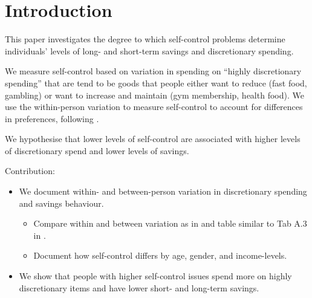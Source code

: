 
\section{Introduction}%
\label{sec:introduction}

This paper investigates the degree to which self-control problems determine
individuals' levels of long- and short-term savings and discretionary
spending.

We measure self-control based on variation in spending on ``highly
discretionary spending'' that are tend to be goods that people either want to
reduce (fast food, gambling) or want to increase and maintain (gym membership,
health food). We use the within-person variation to measure self-control to
account for differences in preferences, following \citet{cherchye2017new}.

We hypothesise that lower levels of self-control are associated with higher
levels of discretionary spend and lower levels of savings.

Contribution:
\begin{itemize}
    \item We document within- and between-person variation in discretionary spending and
        savings behaviour.
        \begin{itemize}
            \item Compare within and between variation as in
                \citet{bogomolov2014daily} and table similar to Tab A.3 in
                \citet{cherchye2017new}.

            \item Document how self-control differs by age, gender, and
                income-levels.
        \end{itemize}

    \item We show that people with higher self-control issues spend more on
        highly discretionary items and have lower short- and long-term savings.

\end{itemize}

